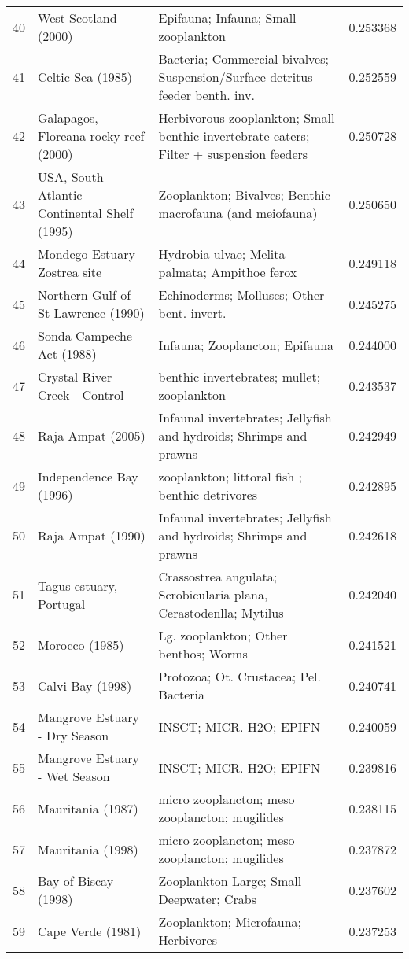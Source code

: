 \begin{tabular}{rllr}
40 & West Scotland (2000) & Epifauna; Infauna; Small zooplankton & 0.253368 \\
41 & Celtic Sea (1985) & Bacteria; Commercial bivalves; Suspension/Surface detritus feeder benth. inv. & 0.252559 \\
42 & Galapagos, Floreana rocky reef (2000) & Herbivorous zooplankton; Small benthic invertebrate eaters; Filter + suspension feeders & 0.250728 \\
43 & USA, South Atlantic Continental Shelf (1995) & Zooplankton; Bivalves; Benthic macrofauna (and meiofauna) & 0.250650 \\
44 & Mondego Estuary - Zostrea site & Hydrobia ulvae; Melita palmata; Ampithoe ferox & 0.249118 \\
45 & Northern Gulf of St Lawrence (1990) & Echinoderms; Molluscs; Other bent. invert. & 0.245275 \\
46 & Sonda Campeche Act (1988) & Infauna; Zooplancton; Epifauna & 0.244000 \\
47 & Crystal River Creek - Control & benthic invertebrates; mullet; zooplankton & 0.243537 \\
48 & Raja Ampat (2005) & Infaunal invertebrates; Jellyfish and hydroids; Shrimps and prawns & 0.242949 \\
49 & Independence Bay (1996) & zooplankton; littoral fish ; benthic detrivores & 0.242895 \\
50 & Raja Ampat (1990) & Infaunal invertebrates; Jellyfish and hydroids; Shrimps and prawns & 0.242618 \\
51 & Tagus estuary, Portugal  & Crassostrea angulata; Scrobicularia plana, Cerastodenlla; Mytilus & 0.242040 \\
52 & Morocco (1985) & Lg. zooplankton; Other benthos; Worms & 0.241521 \\
53 & Calvi Bay (1998) & Protozoa; Ot. Crustacea; Pel. Bacteria & 0.240741 \\
54 & Mangrove Estuary - Dry Season & INSCT; MICR. H2O; EPIFN & 0.240059 \\
55 & Mangrove Estuary - Wet Season & INSCT; MICR. H2O; EPIFN & 0.239816 \\
56 & Mauritania (1987) & micro zooplancton; meso zooplancton; mugilides & 0.238115 \\
57 & Mauritania (1998) & micro zooplancton; meso zooplancton; mugilides & 0.237872 \\
58 & Bay of Biscay (1998) & Zooplankton Large; Small Deepwater; Crabs & 0.237602 \\
59 & Cape Verde (1981) & Zooplankton; Microfauna; Herbivores & 0.237253 \\

\end{tabular}
